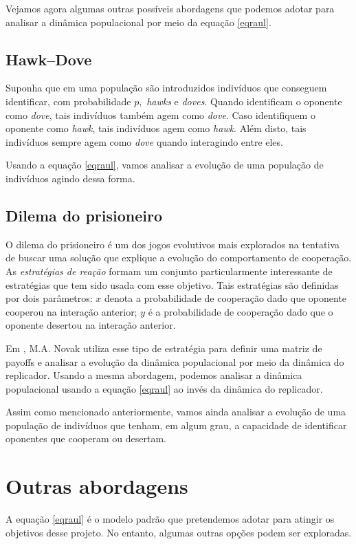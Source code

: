 \documentclass[
	12pt,				%
	openany,			%
	oneoside,			%
	a4paper,			%
	english,			%
	spanish,			%
	brazil,				%
	]{abntex2}
\begin{document}
Vejamos agora algumas outras possíveis abordagens que podemos adotar para analisar a dinâmica populacional por meio da equação \ref{eqraul}.

\subsection{Hawk--Dove}
Suponha que em uma população são introduzidos indivíduos que conseguem identificar, com probabilidade $p,$ \textit{hawks} e \textit{doves}.  Quando identificam o oponente como \textit{dove}, tais indivíduos também agem como \textit{dove}. Caso identifiquem o oponente como \textit{hawk}, tais indivíduos agem como \textit{hawk}. Além disto, tais indivíduos sempre agem como \textit{dove} quando interagindo entre eles. 

Usando a equação \ref{eqraul}, vamos  analisar a  evolução de uma população de indivíduos agindo dessa forma.

\subsection{Dilema do prisioneiro}
O dilema do prisioneiro é um dos jogos evolutivos mais explorados na tentativa de buscar uma solução que explique a evolução do comportamento de cooperação. As \textit{estratégias de reação} formam um conjunto particularmente interessante de estratégias que tem sido usada com esse objetivo. Tais estratégias são definidas por dois parâmetros: $x$ denota a probabilidade de cooperação dado que oponente cooperou na interação anterior;  $y$ é a probabilidade de cooperação dado que o oponente desertou na interação anterior. 

Em \cite{NOVBOOK}, M.A. Novak utiliza esse tipo de estratégia para definir uma matriz de payoffs e analisar a evolução da dinâmica populacional por meio da dinâmica do replicador. Usando a mesma abordagem, podemos analisar a dinâmica populacional usando a equação \ref{eqraul} ao invés da dinâmica do replicador.  


Assim como mencionado anteriormente, vamos ainda analisar a  evolução de uma população de indivíduos que tenham, em algum grau, a capacidade de identificar oponentes que cooperam ou desertam.

\section{Outras abordagens}
A equação \ref{eqraul} é o modelo padrão que pretendemos adotar para atingir os objetivos desse projeto. No entanto, algumas outras opções podem ser exploradas.
\end{document}
